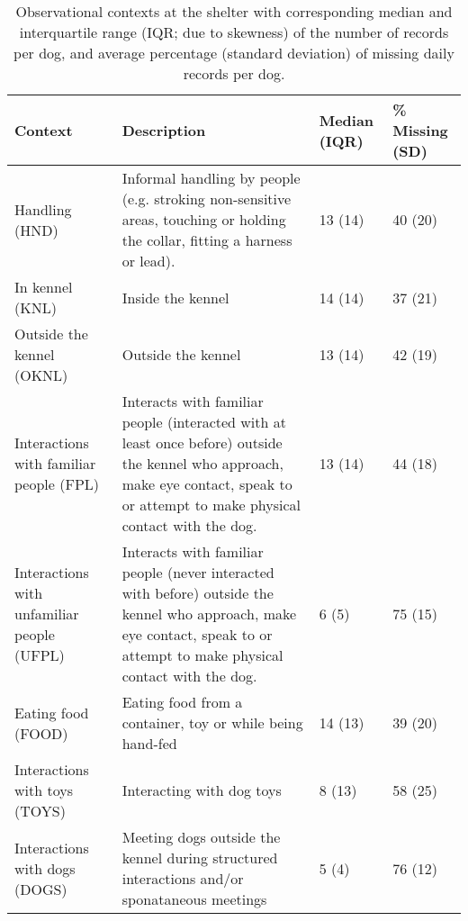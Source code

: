 \documentclass[12pt]{article}
\begin{document}
\begin{table}[t!]
  \centering
  \small
  \begin{tabular}{p{4cm}p{6cm}p{3cm}p{3cm}}
    \textbf{Context} & \textbf{Description} & \textbf{Median (IQR)} & \textbf{\% Missing (SD)}\\ \hline
    Handling (HND) & \footnotesize{Informal handling by people (e.g. stroking non-sensitive areas, touching or holding the collar, fitting a harness or lead).} & 13 (14) & 40 (20) \\
    In kennel (KNL) & \footnotesize{Inside the kennel} & 14 (14) & 37 (21) \\
    Outside the kennel (OKNL) & \footnotesize{Outside the kennel} & 13 (14) & 42 (19)\\
    Interactions with familiar people (FPL) & \footnotesize{Interacts with familiar people (interacted with at least once before) outside the kennel who approach, make eye contact, speak to or attempt to make physical contact with the dog.} & 13 (14) & 44 (18)\\
    Interactions with unfamiliar people (UFPL) & \footnotesize{Interacts with familiar people (never interacted with before) outside the kennel who approach, make eye contact, speak to or attempt to make physical contact with the dog.} & 6 (5) & 75 (15)\\
    Eating food (FOOD) & \footnotesize{Eating food from a container, toy or while being hand-fed} & 14 (13) & 39 (20)\\
    Interactions with toys (TOYS) & \footnotesize{Interacting with dog toys} & 8 (13) & 58 (25) \\
    Interactions with dogs (DOGS) & \footnotesize{Meeting dogs outside the kennel during structured interactions and/or sponataneous meetings} & 5 (4) & 76 (12) \\
    \hline
  \end{tabular}
  \caption{Observational contexts at the shelter with corresponding median and interquartile range (IQR; due to skewness) of the number of records per dog, and average percentage (standard deviation) of missing daily records per dog.}
  \label{table_contexts}
\end{table}
\end{document}
